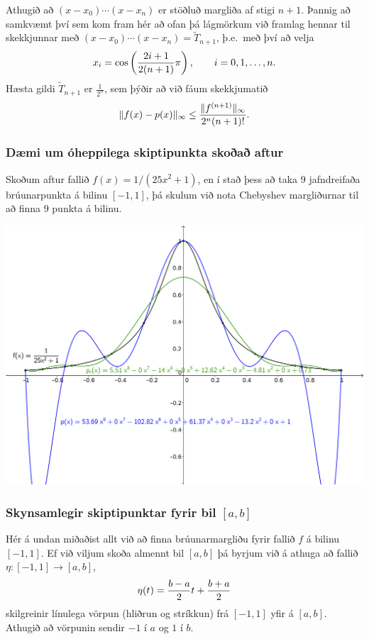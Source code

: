 \documentclass[a4paper,10pt,icelandic]{sphinxmanual}
\begin{document}
Athugið að \((x-x_0)\cdots (x-x_n)\) er stöðluð margliða af stigi
\(n+1\). Þannig að samkvæmt því sem kom fram hér að
ofan þá lágmörkum við framlag hennar
til skekkjunnar með \((x-x_0)\cdots (x-x_n) = \tilde T_{n+1}\),
þ.e. með því að velja
\begin{gather}
\begin{split}x_i = \cos\left(\frac{2i+1}{2(n+1)}\pi\right), \qquad i=0,1,\ldots,n.\end{split}\notag
\end{gather}
Hæsta gildi \(\tilde T_{n+1}\) er \(\frac 1{2^n}\), sem þýðir að
við fáum skekkjumatið
\begin{gather}
\begin{split}\|f(x)-p(x)\|_\infty \leq \frac{\|f^{(n+1)}\|_\infty}{2^n(n+1)!}.\end{split}\notag
\end{gather}

\subsubsection{Dæmi um óheppilega skiptipunkta skoðað aftur}
\label{kafli03:daemi-um-oheppilega-skiptipunkta-skoa-aftur}
Skoðum aftur fallið \(f(x) = 1/(25x^2+1)\), en í stað þess að taka 9
jafndreifaða brúunarpunkta á bilinu \([-1,1]\), þá skulum við nota
Chebyshev margliðurnar til að finna 9 punkta á bilinu.

\includegraphics{vond_bruun2.png}


\subsubsection{Skynsamlegir skiptipunktar fyrir bil \([a,b]\)}
\label{kafli03:skynsamlegir-skiptipunktar-fyrir-bil}
Hér á undan miðaðist allt við að finna brúunarmargliðu fyrir fallið
\(f\) á bilinu \([-1,1]\). Ef við viljum skoða almennt bil
\([a,b]\) þá byrjum við á athuga að fallið
\(\eta:[-1,1]\to [a,b]\),
\begin{gather}
\begin{split}\eta(t) = \frac{b-a}2 t + \frac{b+a}2\end{split}\notag
\end{gather}
skilgreinir línulega vörpun (hliðrun og stríkkun) frá \([-1,1]\)
yfir á \([a,b]\). Athugið að vörpunin sendir \(-1\) í \(a\)
og \(1\) í \(b\).
\end{document}

